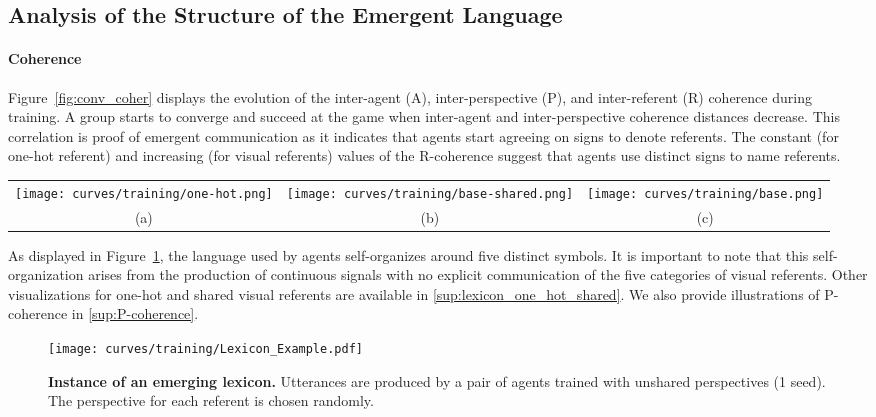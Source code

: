 \subsection{Analysis of the Structure of the Emergent Language}

\paragraph{Coherence}  Figure~\ref{fig:conv_coher} displays the evolution of the inter-agent (A), inter-perspective (P), and inter-referent (R) coherence during training. A group starts to converge and succeed at the game when inter-agent and inter-perspective coherence distances decrease. This correlation is proof of emergent communication as it indicates that agents start agreeing on signs to denote referents. The constant (for one-hot referent) and increasing (for visual referents) values of the R-coherence suggest that agents use distinct signs to name referents.

\begin{figure*}[!h]
    \centering
    \begin{tabular}{@{}c@{}c@{}c@{}}
    \texttt{[image: curves/training/one-hot.png]} &  \texttt{[image: curves/training/base-shared.png]} &
    \texttt{[image: curves/training/base.png]}\\
    (a) & (b) & (c)
    \end{tabular}
    \caption{\textbf{Training success rate (SR) and Coherence distances} (a) one-hot referents (b) visual-shared referents (c) visual-unshared referents.}
    \label{fig:conv_coher}
\end{figure*}

As displayed in Figure~\ref{fig:lexicon_example}, the language used by agents self-organizes around five distinct symbols. It is important to note that this self-organization arises from the production of continuous signals with no explicit communication of the five categories of visual referents. Other visualizations for one-hot and shared visual referents are available in \ap\ref{sup:lexicon_one_hot_shared}. We also provide illustrations of P-coherence in \ap\ref{sup:P-coherence}.

\begin{figure}[!h]
    \centering
    \texttt{[image: curves/training/Lexicon\_Example.pdf]}
    \caption{\textbf{Instance of an emerging lexicon.} Utterances are produced by a pair of agents trained with unshared perspectives (1 seed). The perspective for each referent is chosen randomly.}
    \label{fig:lexicon_example}
\end{figure}


